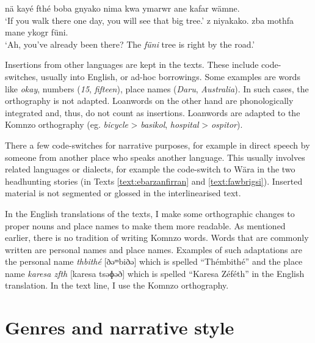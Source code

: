 \ea \label{ex:maraga2-orig}
    \ea\label{ex:maraga2-orig1}
        nä kayé fthé boba gnyako nima kwa ymarwr ane kafar wämne.\\
        \glt `If you walk there one day, you will see that big tree.'
    \ex\setcounter{xnumi}{0}\label{ex:maraga2-orig2}
        z niyakako. zba mothfa mane ykogr füni.\\
        \glt `Ah, you’ve already been there? The \textit{füni} tree is right by the road.' 
    \z
\z

Insertions from other languages are kept in the texts. These include code-switches, usually into English, or ad-hoc borrowings. Some examples are words like \textit{okay}, numbers (\textit{15}, \textit{fifteen}), place names (\textit{Daru}, \textit{Australia}). In such cases, the orthography is not adapted. Loanwords on the other hand are phonologically integrated and, thus, do not count as insertions. Loanwords are adapted to the Komnzo orthography (eg. \textit{bicycle} > \textit{basikol}, \textit{hospital} > \textit{ospitor}).

There a few code-switches for narrative purposes, for example in direct speech by someone from another place who speaks another language. This usually involves related languages or dialects, for example the code-switch to Wära in the two headhunting stories (in Texts \ref{text:ebarzanfirran} and \ref{text:fawbrigsi}). Inserted material is not segmented or glossed in the interlinearised text.

In the English translations of the texts, I make some orthographic changes to proper nouns and place names to make them more readable. As mentioned earlier, there is no tradition of writing Komnzo words. Words that are commonly written are personal names and place names. Examples of such adaptations are the personal name \textit{thbithé} [ðəᵐbiðə] which is spelled ``Thémbithé'' and the place name \textit{karesa zfth} [karesa tsəɸəð] which is spelled ``Karesa Zéféth'' in the English translation. In the text line, I use the Komnzo orthography.

\section{Genres and narrative style}\label{sec:genres}

